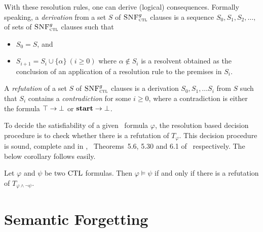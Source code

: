 \documentclass[twoside,11pt]{article}
\begin{document}
With these resolution rules, one can derive (logical) consequences. Formally speaking,
a {\em derivation}  from a set $S$ of ${\textsc{SNF}_{\textsc{ctl}}^g}$ clauses is a sequence
$S_0, S_1, S_2, \ldots, $ of sets of ${\textsc{SNF}_{\textsc{ctl}}^g}$ clauses such that
\begin{itemize}
  \item $S_0=S$, and
  \item $S_{i+1} = S_i\cup \{\alpha\}~(i\ge 0)$ where $\alpha\notin S_i$  is a resolvent obtained as the conclusion of an application of a resolution rule to the premises in $S_i$.
\end{itemize}
A {\em refutation} of a set $S$ of ${\textsc{SNF}_{\textsc{ctl}}^g}$ clauses is a derivation $S_0, S_1,\ldots S_i$ from $S$ such that $S_i$
contains a {\em contradiction} for some $i\ge 0$, where a contradiction is either
the formula $\top\rightarrow\bot$ or $\textbf{start}\rightarrow\bot$.

To decide the satisfiability of a given \CTL\ formula $\varphi$, the resolution based decision procedure is
to check whether there is a refutation of $T_\varphi$.
This decision procedure is sound, complete and in \EXP, \cf\ Theorems~5.6, 5.30 and  6.1 of~\cite{zhang2014resolution} respectively.
The below corollary follows easily.
\begin{corollary}
    Let $\varphi$ and $\psi$ be two $\textrm{CTL}$ formulas. Then $\varphi\models\psi$ if and only if
    there is  a refutation  of $T_{\varphi\land\neg\psi}$.
\end{corollary}



\section{Semantic Forgetting}
\label{forgetting_ctl}
\end{document}

